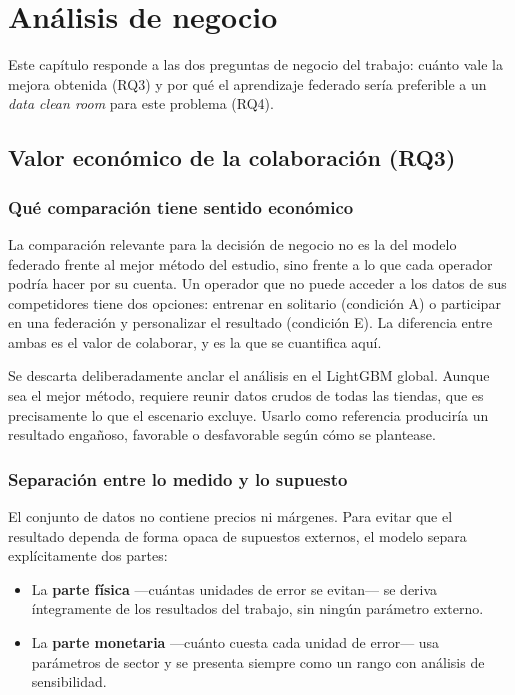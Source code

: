 \chapter{Análisis de negocio}
\label{cap:negocio}

Este capítulo responde a las dos preguntas de negocio del trabajo: cuánto vale la mejora obtenida
(RQ3) y por qué el aprendizaje federado sería preferible a un \emph{data clean room} para este
problema (RQ4).

\section{Valor económico de la colaboración (RQ3)}

\subsection{Qué comparación tiene sentido económico}

La comparación relevante para la decisión de negocio no es la del modelo federado frente al mejor
método del estudio, sino frente a lo que cada operador podría hacer por su cuenta. Un operador que
no puede acceder a los datos de sus competidores tiene dos opciones: entrenar en solitario
(condición A) o participar en una federación y personalizar el resultado (condición E). La
diferencia entre ambas es el valor de colaborar, y es la que se cuantifica aquí.

Se descarta deliberadamente anclar el análisis en el LightGBM global. Aunque sea el mejor método,
requiere reunir datos crudos de todas las tiendas, que es precisamente lo que el escenario excluye.
Usarlo como referencia produciría un resultado engañoso, favorable o desfavorable según cómo se
plantease.

\subsection{Separación entre lo medido y lo supuesto}

El conjunto de datos no contiene precios ni márgenes. Para evitar que el resultado dependa de forma
opaca de supuestos externos, el modelo separa explícitamente dos partes:

\begin{itemize}
  \item La \textbf{parte física} —cuántas unidades de error se evitan— se deriva íntegramente de los
    resultados del trabajo, sin ningún parámetro externo.
  \item La \textbf{parte monetaria} —cuánto cuesta cada unidad de error— usa parámetros de sector y
    se presenta siempre como un rango con análisis de sensibilidad.
\end{itemize}

